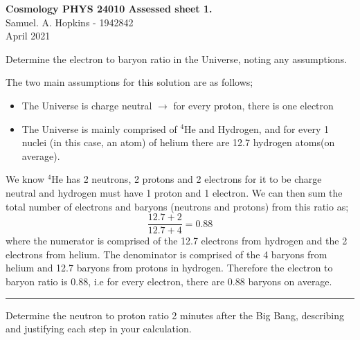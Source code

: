\documentclass[11pt, a4paper, answers]{exam}
\begin{document}
\begin{center}
    {\large \textbf{Cosmology PHYS 24010 Assessed sheet 1.}}\\
    Samuel. A. Hopkins - 1942842 \\
    April 2021

\end{center}
\begin{questions}
    \unframedsolutions
    \question Determine the electron to baryon ratio in the Universe, noting any assumptions.

    \begin{solution}
        The two main assumptions for this solution are as follows;
        \begin{itemize}
            \item The Universe is charge neutral $\to$ for every proton, there is one electron
            \item The Universe is mainly comprised of $^4$He and Hydrogen, and for every 1 nuclei
                  (in this case, an atom) of helium there are 12.7 hydrogen atoms(on average).
        \end{itemize}
        We know $^4$He has 2 neutrons, 2 protons and 2 electrons for it to be charge neutral and
        hydrogen must have 1 proton and 1 electron. We can then sum the total number of electrons
        and baryons (neutrons and protons) from this ratio as;
        \begin{equation*}
            \frac{12.7+2}{12.7+4} = 0.88
        \end{equation*}
        where the numerator is comprised of the 12.7 electrons from hydrogen and the 2 electrons
        from helium. The denominator is comprised of the 4 baryons from helium and 12.7 baryons from
        protons in hydrogen.
        Therefore the electron to baryon ratio is $0.88$, i.e for every electron, there are $0.88$
        baryons on average.
    \end{solution}

    \begin{center}
        \rule{8cm}{0.4pt}
    \end{center}
    \newpage

    \question Determine the neutron to proton ratio 2 minutes after the Big Bang, describing and
    justifying each step in your calculation.


\end{questions}
\end{document}
